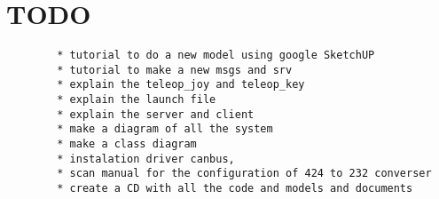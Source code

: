 \documentclass[11pt,a4paper]{report}	%
\begin{document}
		

		\pagestyle{zardoz}
		
		\textheight 24cm
		\textwidth 16cm
		\oddsidemargin 8mm
		\topmargin -15mm
		\headheight 1cm
		\headsep 1cm


		\setcounter{page}{1}
		\tableofcontents																																   



		\pagebreak
    \setcounter{page}{1}																										
    	\chapter*{TODO}
		\begin{verbatim}
		* tutorial to do a new model using google SketchUP
		* tutorial to make a new msgs and srv
		* explain the teleop_joy and teleop_key
		* explain the launch file
		* explain the server and client
		* make a diagram of all the system
		* make a class diagram
		* instalation driver canbus,
		* scan manual for the configuration of 424 to 232 converser
		* create a CD with all the code and models and documents
		\end{verbatim}    
    
    		 
		
		
		
		
		
		
		
\end{document}
